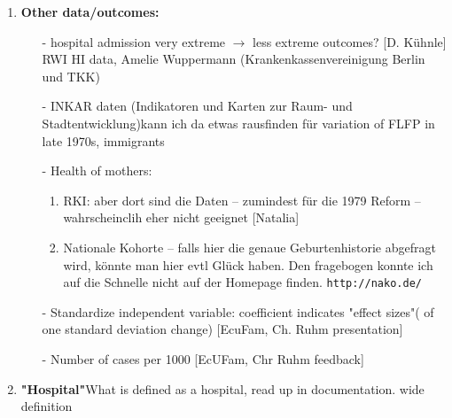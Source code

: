 \documentclass[11pt,a4paper]{article}
\begin{document}
{\begin{enumerate}
\item \textbf{Other data/outcomes:}\vspace{-1 em}
\begin{itemize}
\item[-] hospital admission very extreme $\rightarrow$ less extreme outcomes? [D. Kühnle] RWI HI data, Amelie Wuppermann (Krankenkassenvereinigung Berlin und TKK)
\item[-] INKAR daten (Indikatoren und Karten zur Raum- und Stadtentwicklung)\newline kann ich da etwas rausfinden für variation of FLFP in late 1970s, immigrants 
\item[-] Health of mothers: \vspace{-.5em}
\begin{enumerate}
\item RKI: aber dort sind die Daten – zumindest für die 1979 Reform – wahrscheinclih eher nicht geeignet [Natalia]
\item  Nationale Kohorte – falls hier die genaue Geburtenhistorie abgefragt wird, könnte man hier evtl Glück haben. Den fragebogen konnte ich auf die Schnelle nicht auf der Homepage finden. \texttt{http://nako.de/}
\end{enumerate}
\item[-] Standardize independent variable: coefficient indicates "effect sizes"( of one standard deviation change) [EcuFam, Ch. Ruhm presentation]
\item[-] Number of cases  per 1000 [EcUFam, Chr Ruhm feedback] 
\end{itemize}


\item \textbf{"Hospital"}\newline What is defined as a hospital, read up in documentation. wide definition



\end{enumerate}}
\end{document}
